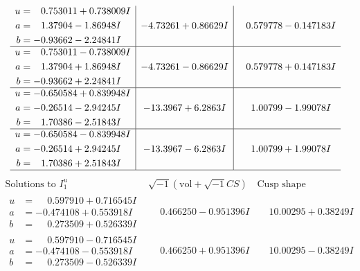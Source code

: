 \documentclass[1p]{elsarticle_modified}
\theoremstyle{definition}
\newcommand{\I}{\sqrt{-1}}
\begin{document}
$$\begin{array}{c|c|c}
\begin{aligned}
u &= \phantom{-}0.753011 + 0.738009 I \\
a &= \phantom{-}1.37904 - 1.86948 I \\
b &= -0.93662 - 2.24841 I\end{aligned}
 & -4.73261 + 0.86629 I & \phantom{-}0.579778 - 0.147183 I \\ \hline\begin{aligned}
u &= \phantom{-}0.753011 - 0.738009 I \\
a &= \phantom{-}1.37904 + 1.86948 I \\
b &= -0.93662 + 2.24841 I\end{aligned}
 & -4.73261 - 0.86629 I & \phantom{-}0.579778 + 0.147183 I \\ \hline\begin{aligned}
u &= -0.650584 + 0.839948 I \\
a &= -0.26514 - 2.94245 I \\
b &= \phantom{-}1.70386 - 2.51843 I\end{aligned}
 & -13.3967 + 6.2863 I & \phantom{-}1.00799 - 1.99078 I \\ \hline\begin{aligned}
u &= -0.650584 - 0.839948 I \\
a &= -0.26514 + 2.94245 I \\
b &= \phantom{-}1.70386 + 2.51843 I\end{aligned}
 & -13.3967 - 6.2863 I & \phantom{-}1.00799 + 1.99078 I\\
 \hline 
 \end{array}$$\newpage$$\begin{array}{c|c|c}  
\text{Solutions to }I^u_{1}& \I (\text{vol} + \sqrt{-1}CS) & \text{Cusp shape}\\
 \hline 
\begin{aligned}
u &= \phantom{-}0.597910 + 0.716545 I \\
a &= -0.474108 + 0.553918 I \\
b &= \phantom{-}0.273509 + 0.526339 I\end{aligned}
 & \phantom{-}0.466250 - 0.951396 I & \phantom{-}10.00295 + 0.38249 I \\ \hline\begin{aligned}
u &= \phantom{-}0.597910 - 0.716545 I \\
a &= -0.474108 - 0.553918 I \\
b &= \phantom{-}0.273509 - 0.526339 I\end{aligned}
 & \phantom{-}0.466250 + 0.951396 I & \phantom{-}10.00295 - 0.38249 I \\ \hline\begin{aligned}

\end{aligned}
\end{array}$$
\end{document}
